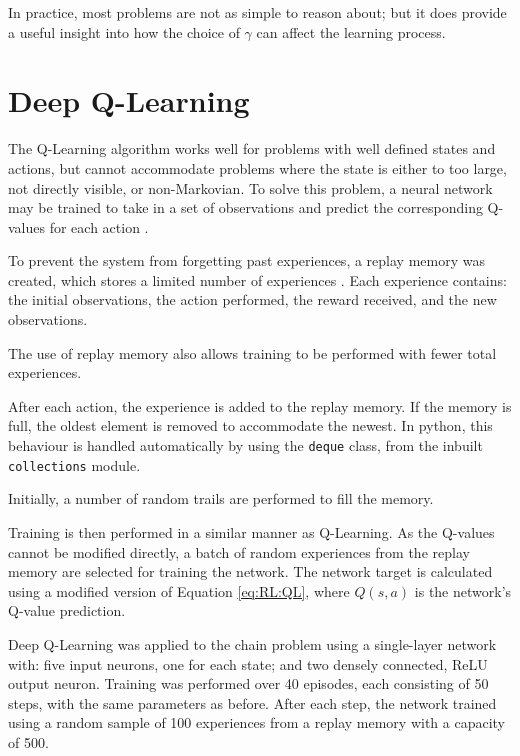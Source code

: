 In practice, most problems are not as simple to reason about; but it does
provide a useful insight into how the choice of $\gamma$ can affect the learning
process.



\section{Deep Q-Learning}

The Q-Learning algorithm works well for problems with well defined states and
actions, but cannot accommodate problems where the state is either to too large,
not directly visible, or non-Markovian.
To solve this problem, a neural network may be trained to take in a set of
observations and predict the corresponding Q-values for each action
\citep{Lin:1990:Self}.

To prevent the system from forgetting past experiences, a replay memory was
created, which stores a limited number of experiences \citep{Lin:1992:Self}.
Each experience contains: the initial observations, the action performed,
the reward received, and the new observations.

The use of replay memory also allows training to be performed with fewer
total experiences.

After each action, the experience is added to the replay memory.
If the memory is full, the oldest element is removed to accommodate the newest.
In python, this behaviour is handled automatically by using the \texttt{deque}
class, from the inbuilt \texttt{collections} module.

Initially, a number of random trails are performed to fill the memory.

Training is then performed in a similar manner as Q-Learning.
As the Q-values cannot be modified directly, a batch of random experiences from
the replay memory are selected for training the network.
The network target is calculated using a modified version of Equation
\ref{eq:RL:QL}, where $Q(s,a)$ is the network's Q-value prediction.

Deep Q-Learning was applied to the chain problem using a single-layer network
with: five input neurons, one for each state; and two densely connected, ReLU
output neuron.
Training was performed over 40 episodes, each consisting of 50 steps, with the
same parameters as before.
After each step, the network trained using a random sample of 100 experiences
from a replay memory with a capacity of 500.



